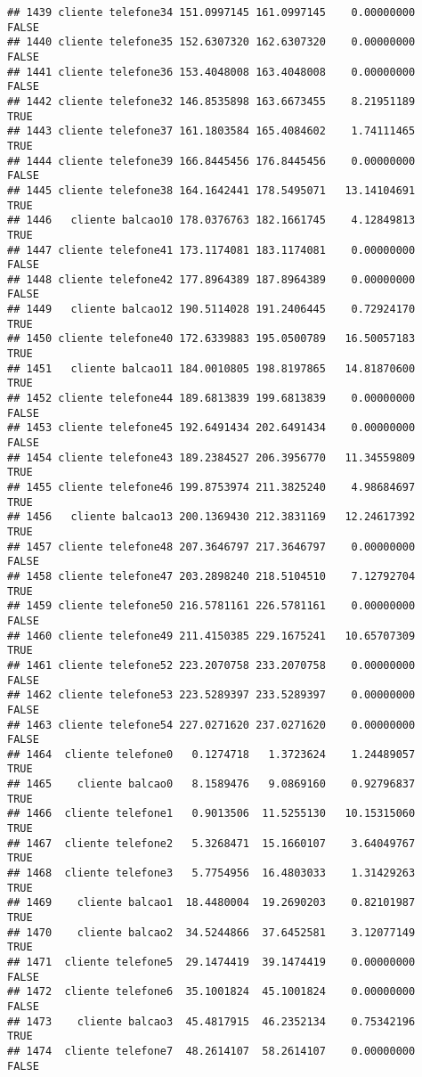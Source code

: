 \documentclass[
]{article}
\begin{document}
\begin{verbatim}
## 1439 cliente telefone34 151.0997145 161.0997145    0.00000000    FALSE
## 1440 cliente telefone35 152.6307320 162.6307320    0.00000000    FALSE
## 1441 cliente telefone36 153.4048008 163.4048008    0.00000000    FALSE
## 1442 cliente telefone32 146.8535898 163.6673455    8.21951189     TRUE
## 1443 cliente telefone37 161.1803584 165.4084602    1.74111465     TRUE
## 1444 cliente telefone39 166.8445456 176.8445456    0.00000000    FALSE
## 1445 cliente telefone38 164.1642441 178.5495071   13.14104691     TRUE
## 1446   cliente balcao10 178.0376763 182.1661745    4.12849813     TRUE
## 1447 cliente telefone41 173.1174081 183.1174081    0.00000000    FALSE
## 1448 cliente telefone42 177.8964389 187.8964389    0.00000000    FALSE
## 1449   cliente balcao12 190.5114028 191.2406445    0.72924170     TRUE
## 1450 cliente telefone40 172.6339883 195.0500789   16.50057183     TRUE
## 1451   cliente balcao11 184.0010805 198.8197865   14.81870600     TRUE
## 1452 cliente telefone44 189.6813839 199.6813839    0.00000000    FALSE
## 1453 cliente telefone45 192.6491434 202.6491434    0.00000000    FALSE
## 1454 cliente telefone43 189.2384527 206.3956770   11.34559809     TRUE
## 1455 cliente telefone46 199.8753974 211.3825240    4.98684697     TRUE
## 1456   cliente balcao13 200.1369430 212.3831169   12.24617392     TRUE
## 1457 cliente telefone48 207.3646797 217.3646797    0.00000000    FALSE
## 1458 cliente telefone47 203.2898240 218.5104510    7.12792704     TRUE
## 1459 cliente telefone50 216.5781161 226.5781161    0.00000000    FALSE
## 1460 cliente telefone49 211.4150385 229.1675241   10.65707309     TRUE
## 1461 cliente telefone52 223.2070758 233.2070758    0.00000000    FALSE
## 1462 cliente telefone53 223.5289397 233.5289397    0.00000000    FALSE
## 1463 cliente telefone54 227.0271620 237.0271620    0.00000000    FALSE
## 1464  cliente telefone0   0.1274718   1.3723624    1.24489057     TRUE
## 1465    cliente balcao0   8.1589476   9.0869160    0.92796837     TRUE
## 1466  cliente telefone1   0.9013506  11.5255130   10.15315060     TRUE
## 1467  cliente telefone2   5.3268471  15.1660107    3.64049767     TRUE
## 1468  cliente telefone3   5.7754956  16.4803033    1.31429263     TRUE
## 1469    cliente balcao1  18.4480004  19.2690203    0.82101987     TRUE
## 1470    cliente balcao2  34.5244866  37.6452581    3.12077149     TRUE
## 1471  cliente telefone5  29.1474419  39.1474419    0.00000000    FALSE
## 1472  cliente telefone6  35.1001824  45.1001824    0.00000000    FALSE
## 1473    cliente balcao3  45.4817915  46.2352134    0.75342196     TRUE
## 1474  cliente telefone7  48.2614107  58.2614107    0.00000000    FALSE

\end{verbatim}
\end{document}
